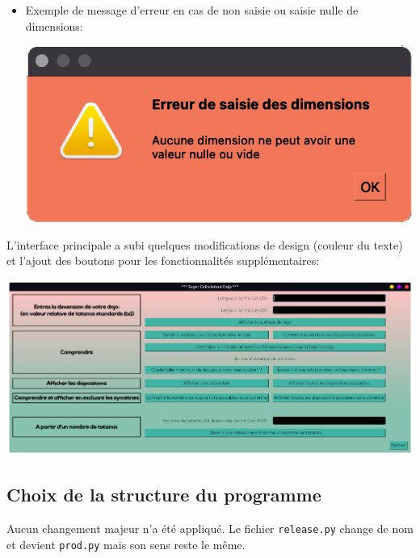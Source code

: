 \begin{itemize}
    \item Exemple de message d’erreur en cas de non saisie ou saisie nulle de dimensions:

          \begin{center}
              \includegraphics[scale=0.25]{images/prodErreurSaisie.png}
          \end{center}


\end{itemize}
L’interface principale a subi quelques modifications de design (couleur du texte) et l’ajout des boutons pour les
fonctionnalités supplémentaires:

\begin{center}
    \includegraphics[scale=0.25]{images/prodInterface.png}
\end{center}

\subsection{Choix de la structure du programme}

Aucun changement majeur n’a été appliqué. Le fichier \texttt{release.py} change de nom et devient \texttt{prod.py} mais son sens reste le même.


